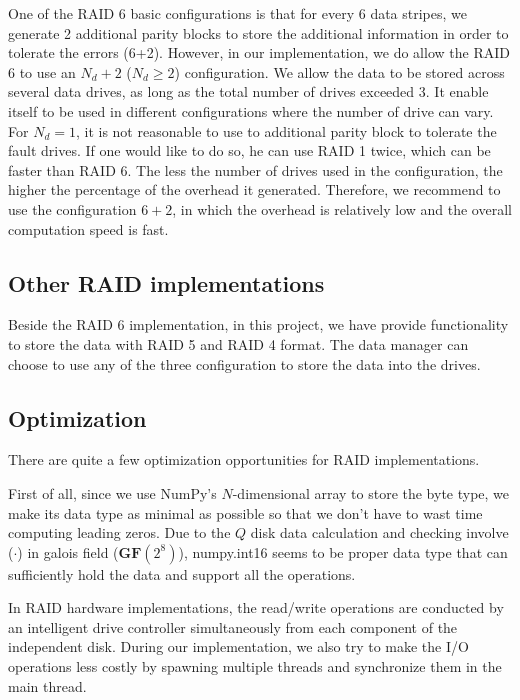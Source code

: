 One of the RAID 6 basic configurations is that for every 6 data stripes, we generate 2 additional parity blocks to store the additional information in order to tolerate the errors (6+2). However, in our implementation, we do allow the RAID 6 to use an $N_d+2$ ($N_d \geq 2$) configuration. We allow the data to be stored across several data drives, as long as the total number of drives exceeded 3. It enable itself to be used in different configurations where the number of drive can vary. For $N_d = 1$, it is not reasonable to use to additional parity block to tolerate the fault drives. If one would like to do so, he can use RAID 1 twice, which can be faster than RAID 6. The less the number of drives used in the configuration, the higher the percentage of the overhead it generated. Therefore, we recommend to use the configuration $6 + 2$, in which the overhead is relatively low and the overall computation speed is fast.

\subsection{Other RAID implementations}

Beside the RAID 6 implementation, in this project, we have provide functionality to store the data with RAID 5 and RAID 4 format. The data manager can choose to use any of the three configuration to store the data into the drives.

\subsection{Optimization}

There are quite a few optimization opportunities for RAID implementations.

First of all, since we use NumPy's $N$-dimensional array to store the byte type, we make its data type as minimal as possible so that we don't have to wast time computing leading zeros. Due to the $Q$ disk data calculation and checking involve ($\cdot$) in galois field ($\mathbf{GF}(2^8)$), \textsf{numpy.int16} seems to be proper data type that can sufficiently hold the data and support all the operations.

In RAID hardware implementations, the read/write operations are conducted by an intelligent drive controller simultaneously from each component of the independent disk. During our implementation, we also try to make the I/O operations less costly by spawning multiple threads and synchronize them in the main thread.

